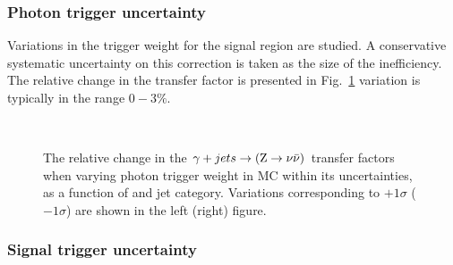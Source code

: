 \subsubsection*{Photon trigger uncertainty}
\label{sec:tfSyst_photonTrigger}

Variations in the trigger weight for the signal region are studied. A conservative systematic
uncertainty on this correction is taken as the size of the inefficiency. 
The relative change in the \gj transfer factor is presented in Fig.~\ref{fig:tfSyst_photonTrigger_gjToZinv}
variation is typically in the range $0-3\%$.


\begin{figure}[!h]
  \centering
   ~~
  \\

  \caption{\label{fig:tfSyst_photonTrigger_gjToZinv} The relative change in
  the $\gamma + jets \rightarrow ({\text Z} \rightarrow \nu\bar{\nu})$ transfer
  factors when varying photon trigger weight in MC within its uncertainties, as a function of \scalht and jet category. 
  Variations corresponding to $+1\sigma$ ($-1\sigma$) are shown in the left (right) figure. 
  }
\end{figure}

\subsubsection*{Signal trigger uncertainty}
\label{sec:tfSyst_topPt}

